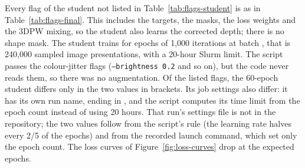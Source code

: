 Every flag of the student not listed in Table~\ref{tab:flags-student} is as in Table~\ref{tab:flags-final}. This
includes the targets, the masks, the loss weights and the 3DPW mixing, so the student also learns the corrected depth;
there is no shape mask. The student trains for \MethodStudentEpochs{} epochs of 1,000 iterations at batch
\MethodStudentBatch, that is 240,000 sampled image presentations, with a 20-hour Slurm limit. The script passes the
colour-jitter flags (\texttt{--brightness 0.2} and so on), but the code never reads them, so there was no
augmentation. Of the listed flags, the 60-epoch student differs only in the two values in brackets. Its job settings
also differ: it has its own run name, ending in , and the script computes its time limit from the epoch
count instead of using 20 hours. That run's settings file is not in the repository; the two values follow from the
script's rule (the learning rate halves every 2/5 of the epochs) and from the recorded launch command, which set only
the epoch count. The loss curves of Figure~\ref{fig:loss-curves} drop at the expected epochs.

